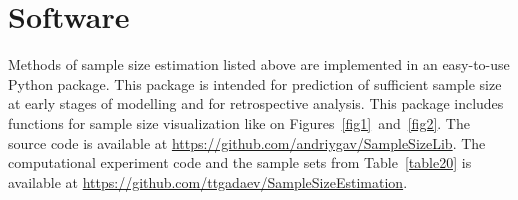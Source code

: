 \documentclass[
11pt,%
tightenlines,%
twoside,%
onecolumn,%
nofloats,%
nobibnotes,%
nofootinbib,%
superscriptaddress,%
noshowpacs,%
centertags]%
{revtex4}
\begin{document}
%
%

\section{Software}
Methods of sample size estimation listed above are implemented in an easy-to-use Python package. This package is intended for prediction of sufficient sample size at early stages of modelling and for retrospective analysis. This package includes functions for sample size visualization like on Figures~\ref{fig1}~and~\ref{fig2}. The source code is available at \mbox{\url{https://github.com/andriygav/SampleSizeLib}}. The computational experiment code and the sample sets from Table~\ref{table20} is available at \mbox{\url{https://github.com/ttgadaev/SampleSizeEstimation}}.
\end{document}
